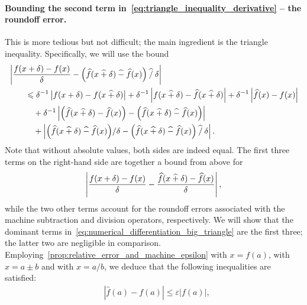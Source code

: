 \begin{solution}
    \paragraph{Bounding the second term in~\eqref{eq:triangle_inequality_derivative} -- the roundoff error.}
    This is more tedious but not difficult;
    the main ingredient is the triangle inequality.
    Specifically, we will use the bound
    \begin{align}
        \nonumber
        &\left\lvert \frac{f(x + \delta) - f(x)}{\delta} - \Bigl(\widehat f(x \mathbin{\widehat +} \delta) \mathbin{\widehat -} \widehat f(x)\Bigr) \mathbin{\widehat /} \delta \right\rvert \\
        \nonumber
        &\qquad \leqslant \delta^{-1}\left\lvert f(x+ \delta) - f(x\mathbin{\widehat +} \delta)  \right\rvert
         + \delta^{-1} \left\lvert f(x\mathbin{\widehat +} \delta) - \widehat f(x \mathbin{\widehat +} \delta)  \right\rvert
         + \delta^{-1} \left\lvert \widehat f(x) - f(x)  \right\rvert \\
        \nonumber
        &\qquad \quad + \delta^{-1} \left\lvert \Bigl(\widehat f(x \mathbin{\widehat +} \delta) - \widehat f(x)\Bigr) - \Bigl(\widehat f(x \mathbin{\widehat +} \delta) \mathbin{\widehat -} \widehat f(x)\Bigr) \right\rvert  \\
        \label{eq:numerical_differentiation_big_triangle}
        &\qquad \quad + \left\lvert \Bigl(\widehat f(x \mathbin{\widehat +} \delta) \mathbin{\widehat -} \widehat f(x)\Bigr) / \delta - \Bigl(\widehat f(x \mathbin{\widehat +} \delta) \mathbin{\widehat -} \widehat f(x)\Bigr) \mathbin{\widehat /} \delta \right\rvert.
    \end{align}
    Note that without absolute values,
    both sides are indeed equal.
    The first three terms on the right-hand side are together a bound from above for
    \begin{equation}
        \label{eq:bound_above_first_three_terms}
        \left\lvert \frac{f(x+\delta) - f(x) }{\delta} - \frac{ \widehat f(x\mathbin{\widehat +}\delta) - \widehat f(x) }{\delta} \right\rvert,
    \end{equation}
    while the two other terms account for the roundoff errors associated with the machine subtraction and division operators,
    respectively.
    We will show that the dominant terms in~\eqref{eq:numerical_differentiation_big_triangle} are the first three;
    the latter two are negligible in comparison.
    Employing~\cref{prop:relative_error_and_machine_epsilon} with $x = f(a)$,
    with $x = a \pm b$ and with $x = a/b$,
    we deduce that the following inequalities are satisfied:
    \begin{align}
        \label{eq:inequalities_numerical_differentiation}
        &\left\lvert \widehat f(a) - f(a) \right\rvert \leq \varepsilon \lvert f(a) \rvert,

\end{align}
\end{solution}

